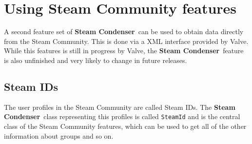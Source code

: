 \documentclass[draft=false, fontsize=12pt, oneside, paper=a4, DIV15,
twocolumn=false, footsepline, headsepline, titlepage, parskip=half]{scrreprt}
\newcommand{\steamcondenser}{\textbf{Steam Condenser}}
\begin{document}
\section{Using Steam Community features}
A second feature set of \steamcondenser\ can be used to obtain data directly
from the Steam Community. This is done via a XML interface provided by Valve. While
this features is still in progress by Valve, the \steamcondenser\ feature is
also unfinished and very likely to change in future releases.

\subsection{Steam IDs}
The user profiles in the Steam Community are called Steam IDs. The
\steamcondenser\ class representing this profiles is called \lstinline{SteamId}
and is the central class of the Steam Community features, which can be used to
get all of the other information about groups and so on.







\lstlistoflistings
\end{document}
